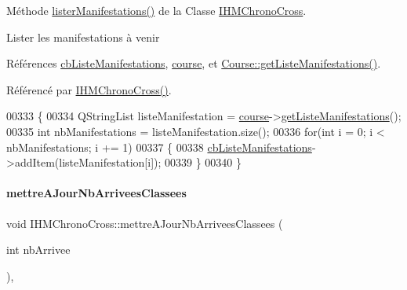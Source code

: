Méthode \hyperlink{class_i_h_m_chrono_cross_adb47e6ee9c2a917a6df77b64930c3c48}{lister\+Manifestations()} de la Classe \hyperlink{class_i_h_m_chrono_cross}{I\+H\+M\+Chrono\+Cross}. 

Lister les manifestations à venir 

Références \hyperlink{class_i_h_m_chrono_cross_a4b7a6af527d8d2d28d8ea6ea7cbfac75}{cb\+Liste\+Manifestations}, \hyperlink{class_i_h_m_chrono_cross_a03a8226c0e7f423d29302d9a06284ab4}{course}, et \hyperlink{class_course_a0d995ef72152208e02eb3b10315dfabb}{Course\+::get\+Liste\+Manifestations()}.



Référencé par \hyperlink{class_i_h_m_chrono_cross_a479fc90733fba3e65fb06aa4a3adc02e}{I\+H\+M\+Chrono\+Cross()}.


\begin{DoxyCode}
00333 \{
00334     QStringList listeManifestation = \hyperlink{class_i_h_m_chrono_cross_a03a8226c0e7f423d29302d9a06284ab4}{course}->\hyperlink{class_course_a0d995ef72152208e02eb3b10315dfabb}{getListeManifestations}();
00335     \textcolor{keywordtype}{int} nbManifestations = listeManifestation.size();
00336     \textcolor{keywordflow}{for}(\textcolor{keywordtype}{int} i = 0; i < nbManifestations; i += 1)
00337     \{
00338         \hyperlink{class_i_h_m_chrono_cross_a4b7a6af527d8d2d28d8ea6ea7cbfac75}{cbListeManifestations}->addItem(listeManifestation[i]);
00339     \}
00340 \}
\end{DoxyCode}
\mbox{\label{class_i_h_m_chrono_cross_a3d786cb4b5c5e3a4bd566f19409601d5}} 
\paragraph{\texorpdfstring{mettre\+A\+Jour\+Nb\+Arrivees\+Classees}{mettreAJourNbArriveesClassees}}
{\footnotesize\ttfamily void I\+H\+M\+Chrono\+Cross\+::mettre\+A\+Jour\+Nb\+Arrivees\+Classees (\begin{DoxyParamCaption}\item[{int}]{nb\+Arrivee }\end{DoxyParamCaption})\hspace{0.3cm}{\ttfamily [private]}, {\ttfamily [slot]}}



